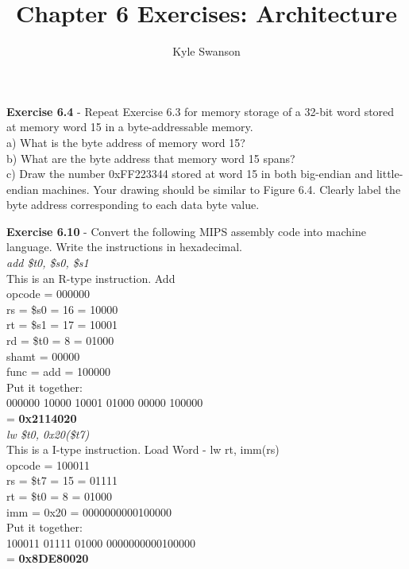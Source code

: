 \documentclass[12pt,a4paper]{report}
\author{Kyle Swanson}
\title{Chapter 6 Exercises: Architecture}
\begin{document}
\maketitle
\begin{normalsize}

\textbf{Exercise 6.4} - Repeat Exercise 6.3 for memory storage of a 32-bit word stored at memory word 15 in a byte-addressable memory. \\
a) What is the byte address of memory word 15? \\
b) What are the byte address that memory word 15 spans? \\
c) Draw the number 0xFF223344 stored at word 15 in both big-endian and little-endian machines. Your drawing should be similar to Figure 6.4. Clearly label the byte address corresponding to each data byte value. \\

\medskip

\textbf{Exercise 6.10} - Convert the following MIPS assembly code into machine language. Write the instructions in hexadecimal. \\
\textit{add \$t0, \$s0, \$s1} \\
This is an R-type instruction. Add \\
opcode = 000000 \\
rs = \$s0 = 16 = 10000 \\
rt = \$s1 = 17 = 10001 \\
rd = \$t0 = 8 = 01000 \\
shamt = 00000 \\
func = add = 100000 \\

Put it together: \\
000000 10000 10001 01000 00000 100000 \\
= \textbf{0x2114020} \\

\textit{lw \$t0, 0x20(\$t7)} \\
This is a I-type instruction. Load Word - lw rt, imm(rs) \\

opcode = 100011 \\
rs = \$t7 = 15 = 01111 \\
rt = \$t0 = 8 = 01000 \\
imm = 0x20 = 0000000000100000 \\

Put it together: \\
100011 01111 01000 0000000000100000 \\
= \textbf{0x8DE80020} \\


\end{normalsize}
\end{document}
